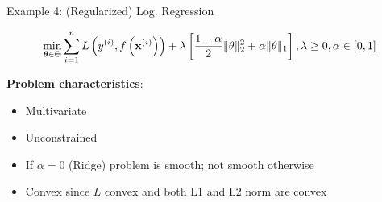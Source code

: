\documentclass[11pt,compress,t,notes=noshow, xcolor=table]{beamer}
\begin{document}
\begin{vbframe}{Example 4: (Regularized) Log. Regression}
\framebreak

\begin{footnotesize}
\begin{eqnarray*}
	\min_{\bm{\theta} \in \Theta} \sum\limits_{i=1}^n L\left(y^{(i)}, f\left(\mathbf{x}^{(i)}\right)\right) + \lambda \left[\frac{1-\alpha}{2}\|\theta\|^{2}_{2} + \alpha\|\theta\|_{1}\right], \lambda \geq 0, \alpha \in [0,1]
\end{eqnarray*}
\end{footnotesize}

\textbf{Problem characteristics}:
\begin{itemize}
	\item Multivariate
	\item Unconstrained
	\item If $\alpha = 0$ (Ridge) problem is smooth; not smooth otherwise
	\item Convex since $L$ convex and both L1 and L2 norm are convex
\end{itemize}

\end{vbframe}
\end{document}

